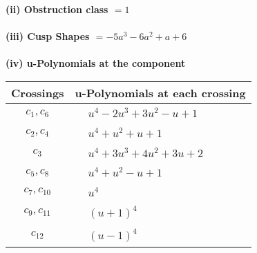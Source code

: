 \documentclass[1p]{elsarticle_modified}
\theoremstyle{definition}
\begin{document}
\flushleft \textbf{(ii) Obstruction class $= 1$}\\~\\
\flushleft \textbf{(iii) Cusp Shapes $= -5 a^3-6 a^2+a+6$}\\~\\
\newpage\renewcommand{\arraystretch}{1}
\flushleft \textbf{(iv) u-Polynomials at the component}\newline \\
\begin{tabular}{m{50pt}|m{274pt}}
Crossings & \hspace{64pt}u-Polynomials at each crossing \\
\hline $$\begin{aligned}c_{1},c_{6}\end{aligned}$$&$\begin{aligned}
&u^4-2 u^3+3 u^2- u+1
\end{aligned}$\\
\hline $$\begin{aligned}c_{2},c_{4}\end{aligned}$$&$\begin{aligned}
&u^4+u^2+u+1
\end{aligned}$\\
\hline $$\begin{aligned}c_{3}\end{aligned}$$&$\begin{aligned}
&u^4+3 u^3+4 u^2+3 u+2
\end{aligned}$\\
\hline $$\begin{aligned}c_{5},c_{8}\end{aligned}$$&$\begin{aligned}
&u^4+u^2- u+1
\end{aligned}$\\
\hline $$\begin{aligned}c_{7},c_{10}\end{aligned}$$&$\begin{aligned}
&u^4
\end{aligned}$\\
\hline $$\begin{aligned}c_{9},c_{11}\end{aligned}$$&$\begin{aligned}
&(u+1)^4
\end{aligned}$\\
\hline $$\begin{aligned}c_{12}\end{aligned}$$&$\begin{aligned}
&(u-1)^4
\end{aligned}$\\
\hline
\end{tabular}\\~\\
\end{document}
